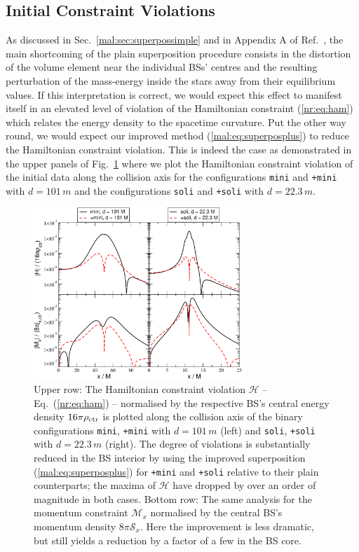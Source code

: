 \subsection{Initial Constraint Violations}
%
As discussed in Sec.~\ref{mal:sec:superpossimple} and in Appendix
A of Ref.~\cite{Helfer:2018vtq},
the main shortcoming of the plain superposition procedure
consists in the distortion of the volume element near the
individual BSs' centres and the resulting perturbation
of the mass-energy inside the stars away from their equilibrium
values. If this interpretation is correct, we would expect
this effect to manifest itself in an elevated level of violation
of the Hamiltonian constraint
(\ref{nr:eq:ham}) which relates the energy density to the
spacetime curvature. Put the other way round, we would
expect our improved method (\ref{mal:eq:superposplus}) to reduce the
Hamiltonian constraint violation. This is indeed the case
as demonstrated in the upper panels of
Fig.~\ref{mal:fig:ham} where we plot the
Hamiltonian constraint violation of the initial data
along the collision axis for the configurations
{\tt mini} and {\tt +mini} with $d=101\,m$ and 
the configurations {\tt soli} and {\tt +soli} with
$d=22.3\,m$.
%
\begin{figure}
  \centering
  \includegraphics[width=0.7\textwidth]{malaise_source/constraints.pdf}
  \caption{Upper row: The Hamiltonian constraint violation $\mathcal{H}$ --
  Eq.~(\ref{nr:eq:ham}) -- normalised by the respective BS's
  central energy density $16\pi \rho_{\rm ctr}$
  is plotted along the collision
  axis of the binary configurations {\tt mini}, {\tt +mini}
  with $d=101\,m$ (left) and {\tt soli}, {\tt +soli} with $d=22.3\,m$ (right).
  The degree of violations is substantially reduced in the
  BS interior by using
  the improved superposition (\ref{mal:eq:superposplus})
  for {\tt +mini} and {\tt +soli} relative to their plain
  counterparts; the maxima of $\mathcal{H}$ have dropped by
  over an order of magnitude in both cases.
  Bottom row: The same analysis for the momentum constraint
  $\mathcal{M}_x$
  normalised by the central BS's momentum density
  $8\pi \mathcal{S}_x$. Here the improvement is less dramatic,
  but still yields a reduction by a factor of a few
  in the BS core.
  }
  \label{mal:fig:ham}
\end{figure}
%

